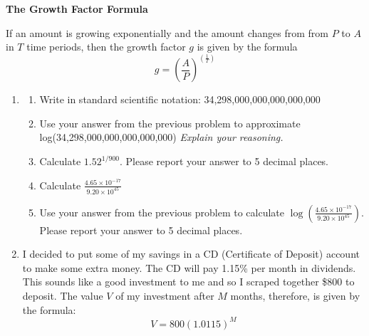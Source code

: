\documentclass[12pt]{article}
\begin{document}
 \vspace{.2in}
 
 \begin{center}
\textbf{The Growth Factor Formula}
\vspace{.1in}

If an amount is growing exponentially and the amount changes from from $P$ to $A$ \\ in $T$ time periods, then the growth factor $g$ is given by the formula $$g=\left(\frac{A}{P}\right)^{\left(\frac{1}{T}\right)}$$

 \end{center}

\hrulefill

\newpage

\begin{enumerate}
\item \begin{enumerate}
\item Write in standard scientific notation:  34,298,000,000,000,000,000
\vfill
\item Use your answer from the previous problem to approximate log(34,298,000,000,000,000,000)  \emph{Explain your reasoning.}
\vfill
\item Calculate $1.52^{1/900}$. Please report your answer to 5 decimal places.
\vfill
\item Calculate $\displaystyle  \frac{4.65 \times 10^{-17}}{9.20 \times 10^{45}}  $
\vfill
\item Use your answer from the previous problem to calculate $\displaystyle \log \left( \frac{4.65 \times 10^{-17}}{9.20 \times 10^{45}} \right) $. Please report your answer to 5 decimal places.
\vfill
\end{enumerate}

\newpage
\item I decided to put some of my savings in a CD (Certificate of Deposit) account to make some extra money.  The CD will pay 1.15\% per month in dividends.  This sounds like a good investment to me and so I scraped together \$800 to deposit.  The value $V$ of my investment after $M$ months, therefore, is given by the formula: $$V=800(1.0115)^M$$


\end{enumerate}
\end{document}
